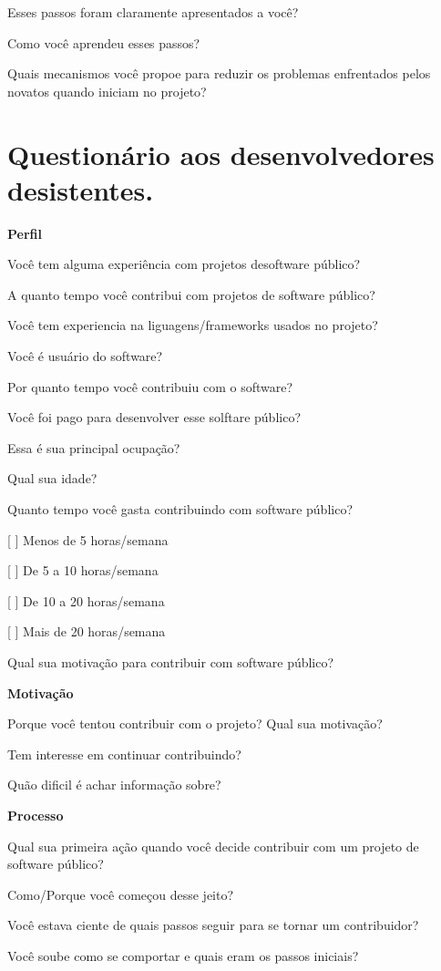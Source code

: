 \begin{anexosenv}
Esses passos foram claramente apresentados a você?

Como você aprendeu esses passos?

Quais mecanismos você propoe para reduzir os problemas enfrentados pelos novatos quando iniciam no projeto?


\chapter{Questionário aos desenvolvedores desistentes.}
\label{anexo c}

\textbf{Perfil}

Você tem alguma experiência com projetos desoftware público?

A quanto tempo você contribui com projetos de software público?

Você tem experiencia na liguagens/frameworks usados no projeto?

Você é usuário do software?

Por quanto tempo você contribuiu com o software?

Você foi pago para desenvolver esse solftare público?

Essa é sua principal ocupação?

Qual sua idade?

Quanto tempo você gasta contribuindo com software público?

[ ] Menos de 5 horas/semana 

[ ] De 5 a 10 horas/semana

[ ] De 10 a 20 horas/semana

[ ] Mais de 20 horas/semana

Qual sua motivação para contribuir com software público?


\textbf{Motivação}

Porque você tentou contribuir com o projeto? Qual sua motivação?

Tem interesse em continuar contribuindo?

Quão dificil é achar informação sobre?


\textbf{Processo}

Qual sua primeira ação quando você decide contribuir com um projeto de software público?

Como/Porque você começou desse jeito?

Você estava ciente de quais passos seguir para se tornar um contribuidor?

Você soube como se comportar e quais eram os passos iniciais?


\end{anexosenv}
